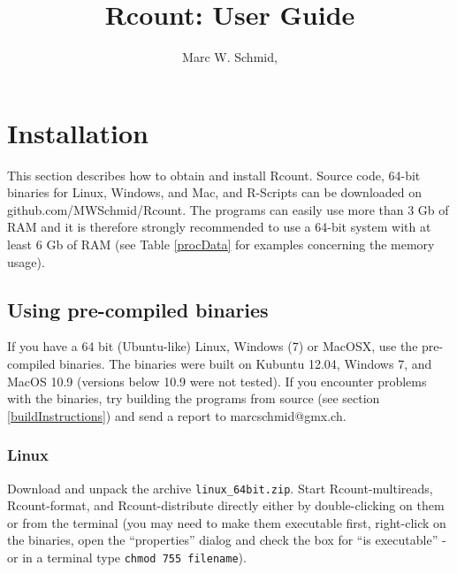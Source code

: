 \documentclass[a4paper,10pt]{article}
\title{Rcount: User Guide}
\author{Marc W. Schmid, {\myEmail}}
\makeatletter
\newcommand{\myEmail}{marcschmid@gmx.ch}
\newcommand{\myWeb}{github.com/MWSchmid/Rcount}
\makeatother
\begin{document}
\maketitle

\thispagestyle{empty}
\clearpage
\pagestyle{plain}
\setcounter{page}{1}
\tableofcontents
\clearpage
\pagestyle{plain}
\setcounter{page}{1}
\section{Installation}
This section describes how to obtain and install Rcount. Source code, 64-bit binaries for Linux, Windows, and Mac, and R-Scripts can be downloaded on {\myWeb}. The programs can easily use more than 3 Gb of RAM and it is therefore strongly recommended to use a 64-bit system with at least 6 Gb of RAM (see Table \ref{procData} for examples concerning the memory usage).
\subsection{Using pre-compiled binaries}
If you have a 64 bit (Ubuntu-like) Linux, Windows (7) or MacOSX, use the pre-compiled binaries. The binaries were built on Kubuntu 12.04, Windows 7, and MacOS 10.9 (versions below 10.9 were not tested). If you encounter problems with the binaries, try building the programs from source (see section \ref{buildInstructions}) and send a report to {\myEmail}.
\subsubsection{Linux}
Download and unpack the archive \texttt{linux\_64bit.zip}. Start Rcount-multireads, Rcount-format, and Rcount-distribute directly either by double-clicking on them or from the terminal (you may need to make them executable first, right-click on the binaries, open the ``properties'' dialog and check the box for ``is executable'' - or in a terminal type \texttt{chmod 755 filename}).
\end{document}
